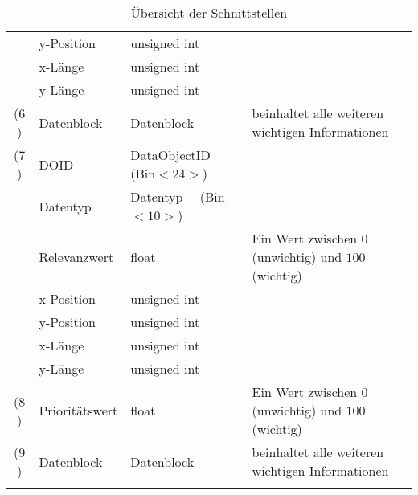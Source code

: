 \begin{longtable}{|c|l|p{3cm}|p{5.01cm}|}
          & y-Position    & unsigned int & \\
          & x-Länge       & unsigned int & \\
          & y-Länge       & unsigned int & \\
    \hline
    ($6$) & Datenblock & Datenblock & beinhaltet alle weiteren wichtigen
    Informationen \\
    \hline
    ($7$) & \gls{DOID}    & DataObjectID (Bin$<24>$) &  \\
          & Datentyp      & Datentyp $\ \ \ $ (Bin$<10>$) & \\
          & Relevanzwert  & float & Ein Wert zwischen $0$ (unwichtig) und $100$
    (wichtig) \\
          & x-Position    & unsigned int & \\
          & y-Position    & unsigned int & \\
          & x-Länge       & unsigned int & \\
          & y-Länge       & unsigned int & \\
    \hline
    ($8$) &  Prioritätswert & float & Ein Wert zwischen $0$ (unwichtig) und
    $100$ (wichtig)\\
    \hline
    ($9$) &  Datenblock & Datenblock & beinhaltet alle weiteren wichtigen
    Informationen \\
  \hline
  \caption{{\"U}bersicht der Schnittstellen} \\
\end{longtable}
